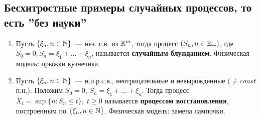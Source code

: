 \subsection*{Бесхитростные примеры случайных процессов, то есть ''без науки''}
\begin{enumerate}
    \item  Пусть $\{ \xi_n, n \in \mathbb{N} \}$~--- нез. с.в. из $\mathbb{R}^m$, тогда процесс $(S_n, n \in \mathbb{Z}_+)$, где $S_0 = 0, S_n = \xi_1 + \ldots + \xi_n$, называется \textbf{случайным блужданием}.
    Физическая модель: прыжки кузнечика.
    \item Пусть $\{ \xi_n, n \in \mathbb{N} \}$~--- н.о.р.с.в., неотрицательные и невырожденные ($\neq const$ п.н.). Положим $S_0 = 0$, $S_n = \xi_1 + \ldots + \xi_n$. Тогда процесс $X_t = \sup\{n : S_n \leq t\}, \; t \geq 0$ называется \textbf{процессом восстановления}, построенным по $\{ \xi_n, n \in \mathbb{N} \}$.
    Физическая модель: замена лампочки.
\end{enumerate}
